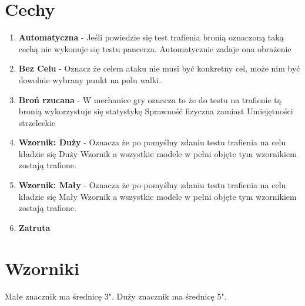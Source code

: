 \section{Cechy}
\begin{enumerate}
    \item \textbf{Automatyczna} - Jeśli powiedzie się test trafienia bronią oznaczoną taką cechą nie wykonuje się testu pancerza. Automatycznie zadaje ona obrażenie
    \item \textbf{Bez Celu} - Oznacz że celem ataku nie musi być konkretny cel, może nim być dowolnie wybrany punkt na polu walki.
    \item \textbf{Broń rzucana} - W mechanice gry oznacza to że do testu na trafienie tą bronią wykorzystuje się statystykę Sprawność fizyczna zamiast Umiejętności strzeleckie
    \item \textbf{Wzornik: Duży} - Oznacza że po pomyślny zdaniu testu trafienia na celu kładzie się Duży Wzornik a wszystkie modele w pełni objęte tym wzornikiem zostają trafione. 
    \item \textbf{Wzornik: Mały} - Oznacza że po pomyślny zdaniu testu trafienia na celu kładzie się Mały Wzornik a wszystkie modele w pełni objęte tym wzornikiem zostają trafione. 
    \item \textbf{Zatruta}
\end{enumerate}

\section{Wzorniki}
 Małe znacznik ma średnicę 3". 
 Duży znacznik ma średnicę 5".
